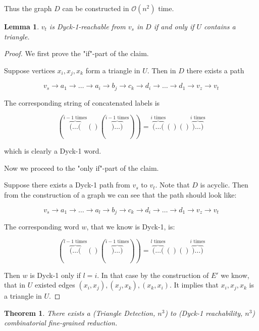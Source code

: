 \documentclass[12pt]{article}
\newtheorem{theorem}{Theorem}[section]
\newtheorem{lemma}{Lemma}[section]
\begin{document}
Thus the graph $D$ can be constructed in $\mathcal{O}(n^2)$ time.

\begin{lemma}
$v_t$ is Dyck-1-reachable from $v_s$ in $D$ if and only if $U$ contains a triangle.
\end{lemma}

\begin{proof}
We first prove the "if"-part of the claim. 

Suppose vertices $x_i, x_j, x_k$ form a triangle in $U$. Then in $D$ there exists a path 

$$v_s \rightarrow a_1 \rightarrow \ldots \rightarrow a_i \rightarrow b_j \rightarrow c_k \rightarrow d_i \rightarrow \ldots \rightarrow d_1 \rightarrow v_z \rightarrow v_t$$

The corresponding string of concatenated labels is 

$$( \overbrace{( \ldots (}^{\text{$i - 1$ times}} ()( \overbrace{) \ldots )}^{\text{$i - 1$ times}} )) = \overbrace{( \ldots (}^{\text{$i$ times}} ()() \overbrace{) \ldots )}^{\text{$i$ times}}$$

which is clearly a Dyck-1 word.

Now we proceed to the "only if"-part of the claim.

Suppose there exists a Dyck-1 path from $v_s$ to $v_t$. Note that $D$ is acyclic. Then from the construction of a graph we can see that the path should look like:

$$v_s \rightarrow a_1 \rightarrow \ldots \rightarrow a_l \rightarrow b_j \rightarrow c_k \rightarrow d_i \rightarrow \ldots \rightarrow d_1 \rightarrow v_z \rightarrow v_t$$

The corresponding word $w$, that we know is Dyck-1, is: 

$$( \overbrace{( \ldots (}^{\text{$l - 1$ times}} ()( \overbrace{) \ldots )}^{\text{$i - 1$ times}} )) = \overbrace{( \ldots (}^{\text{$l$ times}} ()() \overbrace{) \ldots )}^{\text{$i$ times}}$$ 

Then $w$ is Dyck-1 only if $l = i$. In that case by the construction of $E'$ we know, that in $U$ existed edges $(x_i, x_j), (x_j, x_k), (x_k, x_i)$. It implies that $x_i, x_j, x_k$ is a triangle in $U$.
\end{proof}

\begin{theorem}
\label{th:tr_to_dyck}
There exists a (Triangle Detection, $n^3$) to (Dyck-1 reachability, $n^3$) combinatorial fine-grained reduction. 
\end{theorem}
\end{document}
